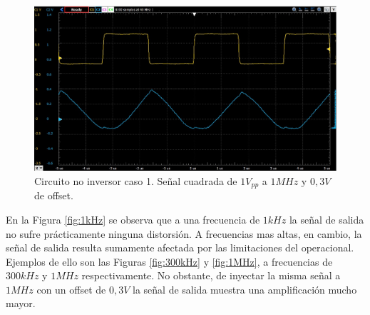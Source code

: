 \begin{figure}[H]
	\centering
	\includegraphics[scale=0.25]{./Imagenes/Sqr1MHzOffset.jpg}
	\caption{Circuito no inversor caso 1. Señal cuadrada de $1V_{pp}$ a $1MHz$ y $0,3V$ de offset.}
	\label{fig:1MHzoffset}
\end{figure}


En la Figura \ref{fig:1kHz} se observa que a una frecuencia de $1kHz$ la señal de salida no sufre prácticamente ninguna distorsión. A frecuencias mas altas, en cambio, la señal de salida resulta sumamente afectada por las limitaciones del operacional. Ejemplos de ello son las Figuras \ref{fig:300kHz} y \ref{fig:1MHz}, a frecuencias de $300kHz$ y $1MHz$ respectivamente. No obstante, de inyectar la misma señal a $1MHz$ con un offset de $0,3V$ la señal de salida muestra una amplificación mucho mayor. 